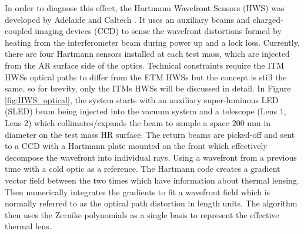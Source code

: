	In order to diagnose this effect, the Hartmann Wavefront Sensors (HWS) \cite{Brooks_OffAxis} \cite{Veitch_HWS_ALIGO} was developed by Adelaide and Caltech \cite{Brooks_HWS_2007} \cite{Brooks_HWS_2009}. It uses an auxiliary beams and charged-coupled imaging devices (CCD) to sense the wavefront distortions formed by heating from the interferometer beam during power up and a lock loss.  Currently, there are four Hartmann sensors installed at each test mass, which are injected from the AR surface side of the optics. Technical constraints require the ITM HWSs optical paths to differ from the ETM HWSs but the concept is still the same, so for brevity, only the ITMs HWSs will be discussed in detail.  In Figure \ref{fig:HWS_optical}, the system starts with an auxiliary super-luminous LED (SLED) beam being injected into the vacuum system and a telescope (Lens 1, Lens 2) which collimates/expands the beam to sample a space 200 mm in diameter on the test mass HR surface.  The return beams are picked-off and sent to a CCD with a Hartmann plate mounted on the front which effectively decompose the wavefront into individual rays.  Using a wavefront from a previous time with a cold optic as a reference. The Hartmann code creates a gradient vector field between the two times which have information about thermal lensing. Then numerically integrates the gradients to fit a wavefront field which is normally referred to as the optical path distortion in length units.  The algorithm then uses the Zernike polynomials as a single basis to represent the effective thermal lens. \cite{Brooks_thesis}
	
